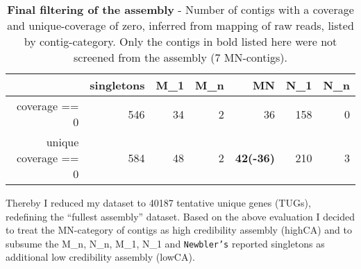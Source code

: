 \begin{table}[ht]
\begin{center}
\begin{tabular}{rrrrrrr}
  \hline
  & singletons & M\_1 & M\_n & MN & N\_1 & N\_n \\ 
  \hline
  coverage == 0 & 546 &  34 &  2 &  36 & 158 &  0 \\ 
  unique coverage == 0 & 584 &  48 &   2 &  \textbf{42(-36)} & 210 &   3 \\ 
  \hline
\end{tabular}
\caption[Final filtering of the assembly]{\textbf{Final filtering of
    the assembly} - Number of contigs with a coverage and
  unique-coverage of zero, inferred from mapping of raw reads, listed
  by contig-category. Only the contigs in bold listed here were not
  screened from the assembly (7 MN-contigs).}
\label{tab:cov.ex}
\end{center}
\end{table}

Thereby I reduced my dataset to 40187 tentative unique genes (TUGs),
redefining the ``fullest assembly'' dataset. Based on the above
evaluation I decided to treat the MN-category of contigs as high
credibility assembly (highCA) and to subsume the M\_n, N\_n, M\_1,
N\_1 and \texttt{Newbler's} reported singletons as additional low
credibility assembly (lowCA).

